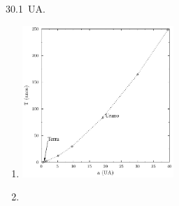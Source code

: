 \documentclass[a4paper]{article}
\begin{document}
\begin{respostas}
  \begin{exercicio}
   \SI{30.1}{UA}.
  \end{exercicio}
  
  \begin{exercicio}
   
  
  \begin{enumerate}
  \item {}\hfill
    \begin{center}
    \includegraphics[width=0.45\textwidth]{Txa_planetas_Sistema_Solar}
    \end{center}
    
  \item {}\hfill
  

\end{enumerate}
\end{exercicio}
\end{respostas}
\end{document}
